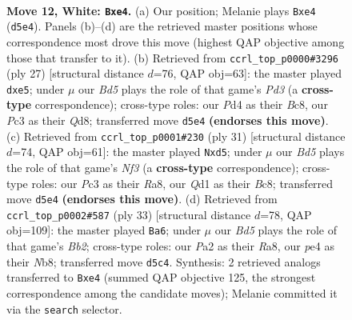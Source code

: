 \documentclass[11pt]{article}
\begin{document}
\clearpage

\begin{figure}[p]\centering
\begin{subfigure}{0.46\textwidth}\centering
\resizebox{\linewidth}{!}{%
\newchessgame
\chessboard[
  setfen={rnbqk2r/1p2p1b1/6p1/p1pB3p/3Pp3/2P5/P2N1PPP/R1BQ1RK1 w kq - 0 12},
  showmover=false,
  pgfstyle=straightmove, color=movearrow, markmove={d5-e4}
]}
\caption{}
\end{subfigure}\hfill
\begin{subfigure}{0.46\textwidth}\centering
\resizebox{\linewidth}{!}{%
\newchessgame
\chessboard[
  setfen={2bq1rk1/p2nppbp/3p2p1/1B2P3/5P2/2Q1B3/P1P3PP/R3K2R b KQ - 0 14},
  showmover=false,
  pgfstyle=straightmove, color=movearrow, markmove={d6-e5}
]}
\caption{}
\end{subfigure}
\\[4pt]
\begin{subfigure}{0.46\textwidth}\centering
\resizebox{\linewidth}{!}{%
\newchessgame
\chessboard[
  setfen={r1bq1rk1/pp3ppp/5n2/1N1Pb3/8/3Q4/PP2BPPP/R1B2RK1 b - - 0 16},
  showmover=false,
  pgfstyle=straightmove, color=movearrow, markmove={f6-d5}
]}
\caption{}
\end{subfigure}\hfill
\begin{subfigure}{0.46\textwidth}\centering
\resizebox{\linewidth}{!}{%
\newchessgame
\chessboard[
  setfen={rn1q1rk1/pb2ppbp/1p4p1/P2P4/5B2/1Q3N2/1P2BPPP/3RK2R b K - 3 17},
  showmover=false,
  pgfstyle=straightmove, color=movearrow, markmove={b7-a6}
]}
\caption{}
\end{subfigure}
\caption{\textbf{Move 12, White: \texttt{Bxe4}.} (a) Our position; Melanie plays \texttt{Bxe4} (\texttt{d5e4}). Panels (b)--(d) are the retrieved master positions whose correspondence most drove this move (highest QAP objective among those that transfer to it). (b) Retrieved from \texttt{ccrl\_top\_p0000\#3296} (ply 27) [structural distance $d$=76, QAP obj=63]: the master played \texttt{dxe5}; under $\mu$ our \emph{Bd5} plays the role of that game's \emph{Pd3} (a \textbf{cross-type} correspondence); cross-type roles: our \emph{P}d4 as their \emph{B}c8, our \emph{P}c3 as their \emph{Q}d8; transferred move \texttt{d5e4} \textbf{(endorses this move)}. (c) Retrieved from \texttt{ccrl\_top\_p0001\#230} (ply 31) [structural distance $d$=74, QAP obj=61]: the master played \texttt{Nxd5}; under $\mu$ our \emph{Bd5} plays the role of that game's \emph{Nf3} (a \textbf{cross-type} correspondence); cross-type roles: our \emph{P}c3 as their \emph{R}a8, our \emph{Q}d1 as their \emph{B}c8; transferred move \texttt{d5e4} \textbf{(endorses this move)}. (d) Retrieved from \texttt{ccrl\_top\_p0002\#587} (ply 33) [structural distance $d$=78, QAP obj=109]: the master played \texttt{Ba6}; under $\mu$ our \emph{Bd5} plays the role of that game's \emph{Bb2}; cross-type roles: our \emph{P}a2 as their \emph{R}a8, our \emph{p}e4 as their \emph{N}b8; transferred move \texttt{d5c4}. Synthesis: 2 retrieved analogs transferred to \texttt{Bxe4} (summed QAP objective 125, the strongest correspondence among the candidate moves); Melanie committed it via the \texttt{search} selector.}
\label{fig:thought-m22}
\end{figure}
\end{document}
